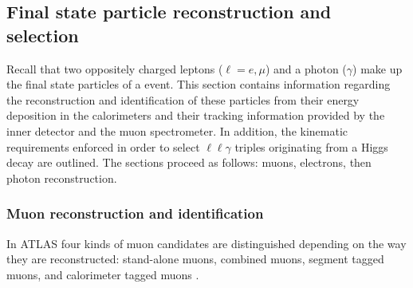 \subsection{Final state particle reconstruction and selection}
Recall that two oppositely charged leptons ($\ell = e, \mu$) and a photon ($\gamma$)
make up the final state particles of a \HToZg event. This section
contains information regarding the reconstruction and identification of these 
particles from their energy deposition in the calorimeters and their tracking
information provided by the inner detector and the muon spectrometer.
In addition, the kinematic requirements enforced in order to select $\ell\ell\gamma$
triples originating from a Higgs decay are outlined. The sections proceed
as follows: muons, electrons, then photon reconstruction.

\subsubsection*{Muon reconstruction and identification}
In ATLAS four kinds of muon candidates are distinguished depending on the
way they are reconstructed: stand-alone muons, combined muons, segment tagged muons,
and calorimeter tagged muons \cite{ATLAS-CONF-2010-064}.
